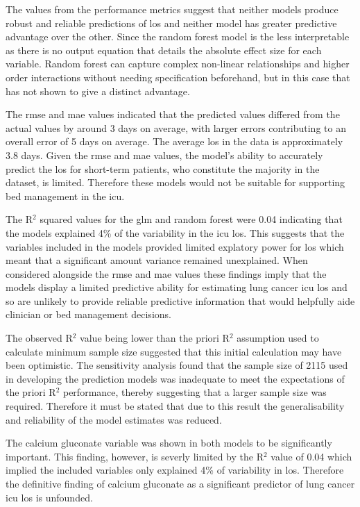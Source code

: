 \documentclass[11pt]{article}
\begin{document}
The values from the performance metrics suggest that neither models produce robust and reliable predictions of \gls{los} and neither model has greater predictive advantage over the other. Since the random forest model is the less interpretable\cite{Song2013} as there is no output equation that details the absolute effect size for each variable. Random forest can capture complex non-linear relationships and higher order interactions without needing specification beforehand,\cite{Simon2023} but in this case that has not shown to give a distinct advantage. 

The \gls{rmse} and \gls{mae} values indicated that the predicted values differed from the actual values by around 3 days on average, with larger errors contributing to an overall error of 5 days on average. The average \gls{los} in the data is approximately 3.8 days. Given the \gls{rmse} and \gls{mae} values, the model's ability to accurately predict the \gls{los} for short-term patients, who constitute the majority in the dataset, is limited. Therefore these models would not be suitable for supporting bed management in the \gls{icu}.

The R\(^2\) squared values for the \gls{glm} and random forest were 0.04 indicating that the models explained 4\% of the variability in the \gls{icu} \gls{los}. This suggests that the variables included in the models provided limited explatory power for \gls{los} which meant that a significant amount variance remained unexplained. When considered alongside the \gls{rmse} and \gls{mae} values these findings imply that the models display a limited predictive ability for estimating lung cancer \gls{icu} \gls{los} and so are unlikely to provide reliable predictive information that would helpfully aide clinician or bed management decisions.

The observed R\(^2\) value being lower than the priori R\(^2\) assumption used to calculate minimum sample size suggested that this initial calculation may have been optimistic. The sensitivity analysis found that the sample size of 2115 used in developing the prediction models was inadequate to meet the expectations of the priori R\(^2\) performance, thereby suggesting that a larger sample size was required. Therefore it must be stated that due to this result the generalisability and reliability of the model estimates was reduced.

The calcium gluconate variable was shown in both models to be significantly important. This finding, however, is severly limited by the R\(^2\) value of 0.04 which implied the included variables only explained 4\% of variability in \gls{los}. Therefore the definitive finding of calcium gluconate as a significant predictor of lung cancer \gls{icu} \gls{los} is unfounded. 
\end{document}
